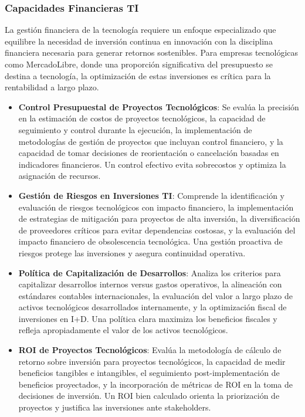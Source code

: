 \subsubsection{Capacidades Financieras TI}

La gestión financiera de la tecnología requiere un enfoque especializado que equilibre la necesidad de inversión continua en innovación con la disciplina financiera necesaria para generar retornos sostenibles. Para empresas tecnológicas como MercadoLibre, donde una proporción significativa del presupuesto se destina a tecnología, la optimización de estas inversiones es crítica para la rentabilidad a largo plazo.

\begin{itemize}
\item \textbf{Control Presupuestal de Proyectos Tecnológicos}: Se evalúa la precisión en la estimación de costos de proyectos tecnológicos, la capacidad de seguimiento y control durante la ejecución, la implementación de metodologías de gestión de proyectos que incluyan control financiero, y la capacidad de tomar decisiones de reorientación o cancelación basadas en indicadores financieros. Un control efectivo evita sobrecostos y optimiza la asignación de recursos.

\item \textbf{Gestión de Riesgos en Inversiones TI}: Comprende la identificación y evaluación de riesgos tecnológicos con impacto financiero, la implementación de estrategias de mitigación para proyectos de alta inversión, la diversificación de proveedores críticos para evitar dependencias costosas, y la evaluación del impacto financiero de obsolescencia tecnológica. Una gestión proactiva de riesgos protege las inversiones y asegura continuidad operativa.

\item \textbf{Política de Capitalización de Desarrollos}: Analiza los criterios para capitalizar desarrollos internos versus gastos operativos, la alineación con estándares contables internacionales, la evaluación del valor a largo plazo de activos tecnológicos desarrollados internamente, y la optimización fiscal de inversiones en I+D. Una política clara maximiza los beneficios fiscales y refleja apropiadamente el valor de los activos tecnológicos.

\item \textbf{ROI de Proyectos Tecnológicos}: Evalúa la metodología de cálculo de retorno sobre inversión para proyectos tecnológicos, la capacidad de medir beneficios tangibles e intangibles, el seguimiento post-implementación de beneficios proyectados, y la incorporación de métricas de ROI en la toma de decisiones de inversión. Un ROI bien calculado orienta la priorización de proyectos y justifica las inversiones ante stakeholders.
\end{itemize}

